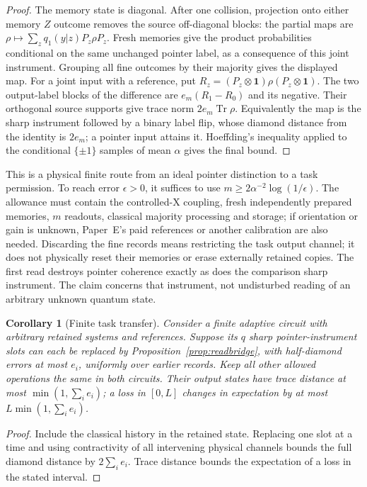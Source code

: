 \documentclass[12pt]{article}
\newtheorem{corollary}[theorem]{Corollary}
\theoremstyle{definition}
\theoremstyle{remark}
\begin{document}
\begin{proof}
The memory state is diagonal. After one collision, projection onto either
memory \(Z\) outcome removes the source off-diagonal blocks: the partial
maps are
\(\rho\mapsto\sum_z q_1(y|z)P_z\rho P_z\).
Fresh memories give the product probabilities conditional on the same
unchanged pointer label, as a consequence of this joint instrument.
Grouping all fine outcomes by their majority gives the displayed map.
For a joint input with a reference, put
\(R_z=(P_z\otimes\mathbf1)\rho(P_z\otimes\mathbf1)\).
The two output-label blocks of the difference are
\(e_m(R_1-R_0)\) and its negative. Their orthogonal source supports give
trace norm \(2e_m\operatorname{Tr}\rho\).
Equivalently the map is the sharp instrument followed by a binary label
flip, whose diamond distance from the identity is \(2e_m\); a pointer
input attains it. Hoeffding's inequality applied to the conditional
\(\{\pm1\}\) samples of mean \(\alpha\) gives the final bound.
\end{proof}

This is a physical finite route from an ideal pointer distinction to a
task permission. To reach error \(\epsilon>0\), it suffices to use
\(m\ge2\alpha^{-2}\log(1/\epsilon)\). The allowance must contain the
controlled-X coupling, fresh independently prepared memories, \(m\)
readouts, classical majority processing and storage; if orientation or
gain is unknown, Paper~E's paid references or another calibration are
also needed. Discarding the fine records means restricting the task
output channel; it does not physically reset their memories or erase
externally retained copies. The first read destroys pointer coherence exactly as does
the comparison sharp instrument. The claim concerns that instrument,
not undisturbed reading of an arbitrary unknown quantum state.

\begin{corollary}[Finite task transfer]\label{cor:tasktransfer}
Consider a finite adaptive circuit with arbitrary retained systems and
references. Suppose its \(q\) sharp pointer-instrument slots can each be
replaced by Proposition~\ref{prop:readbridge}, with half-diamond
errors at most \(e_i\), uniformly over earlier records. Keep all other
allowed operations the same in both circuits. Their output states have
trace distance at most \(\min(1,\sum_i e_i)\); a loss in \([0,L]\) changes
in expectation by at most \(L\min(1,\sum_i e_i)\).
\end{corollary}

\begin{proof}
Include the classical history in the retained state. Replacing one slot
at a time and using contractivity of all intervening physical channels
bounds the full diamond distance by \(2\sum_i e_i\). Trace distance
bounds the expectation of a loss in the stated interval.
\end{proof}
\end{document}
